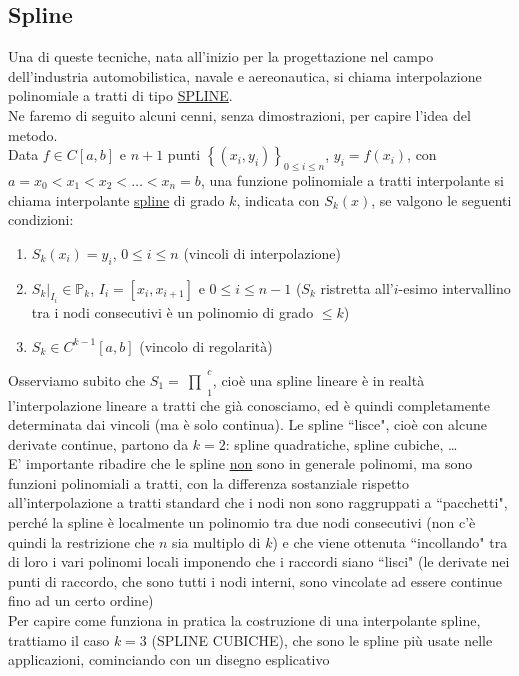 \documentclass[12pt,a4paper]{article}
\newcommand{\inter}{\begin{matrix}\prod\end{matrix}}
\begin{document}
\subsection{Spline}
Una di queste tecniche, nata all'inizio per la progettazione nel campo dell'industria automobilistica, navale e aereonautica, si chiama interpolazione polinomiale a tratti di tipo \uline{SPLINE}.\\
Ne faremo di seguito alcuni cenni, senza dimostrazioni, per capire l'idea del metodo. \\
Data $f \in C[a,b]$ e $n+1$ punti $\left\{ (x_i,y_i) \right\}_{0 \leq i \leq n}$, $y_i=f(x_i)$, con $a=x_0 < x_1 < x_2 <\dots<x_n=b$, una funzione polinomiale a tratti interpolante si chiama interpolante \uline{spline} di grado $k$, indicata con $S_k(x)$, se valgono le seguenti condizioni:
\begin{enumerate}
    \item $S_k(x_i)=y_i$, $0 \leq i \leq n$ (vincoli di interpolazione)
    \item $S_k \vert_{I_i} \in \mathbb{P}_k$, $I_i=[x_i,x_{i+1}]$ e $0 \leq i \leq n-1$ ($S_k$ ristretta all'$i$-esimo intervallino tra i nodi consecutivi è un polinomio di grado $\leq  k$)
    \item $S_k \in C^{k-1}[a,b]$ (vincolo di regolarità)
\end{enumerate}
Osserviamo subito che $S_1=\inter_1^c$, cioè una spline lineare è in realtà l'interpolazione lineare a tratti che già conosciamo, ed è quindi completamente determinata dai vincoli (ma è solo continua). Le spline ``lisce", cioè con alcune derivate continue, partono da $k=2$: spline quadratiche, spline cubiche, \dots \\
E' importante ribadire che le spline \uline{non} sono in generale polinomi, ma sono funzioni polinomiali a tratti, con la differenza sostanziale rispetto all'interpolazione a tratti standard che i nodi non sono raggruppati a ``pacchetti", perché la spline è localmente un polinomio tra due nodi consecutivi (non c'è quindi la restrizione che $n$ sia multiplo di $k$) e che viene ottenuta ``incollando" tra di loro i vari polinomi locali imponendo che i raccordi siano ``lisci" (le derivate nei punti di raccordo, che sono tutti i nodi interni, sono vincolate ad essere continue fino ad un certo ordine) \\ Per capire come funziona in pratica la costruzione di una interpolante spline, trattiamo il caso $k=3$ (SPLINE CUBICHE), che sono le spline più usate nelle applicazioni, cominciando con un disegno esplicativo
\end{document}
